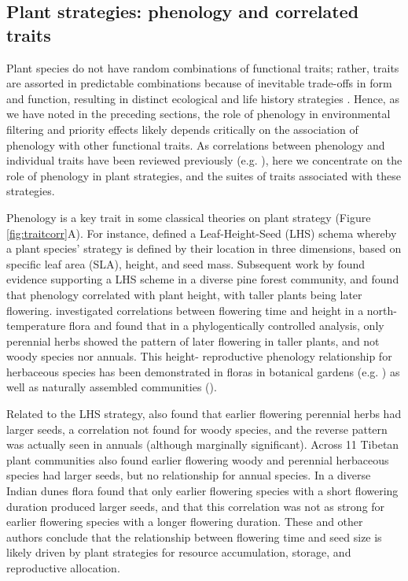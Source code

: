 \documentclass[11pt]{article}
\begin{document}

\subsection*{Plant strategies: phenology and correlated traits}

Plant species do not have random combinations of functional traits; rather, traits are assorted in predictable combinations because of inevitable trade-offs in form and function, resulting in distinct ecological and life history strategies \citep{stearns1998evolution,adler2014functional,westoby2002plant}. Hence, as we have noted in the preceding sections, the role of phenology in environmental filtering and priority effects likely depends critically on the association of phenology with other functional traits. As correlations between phenology and individual traits have been reviewed previously (e.g. \citet{wolkovich2014aob,segrestin2020reproductive}), here we concentrate on the role of phenology in plant strategies, and the suites of traits associated with these strategies.

Phenology is a key trait in some classical theories on plant strategy (Figure \ref{fig:traitcorr}A). For instance, \citet{westoby1998leaf} defined a Leaf-Height-Seed (LHS) schema whereby a plant species’ strategy is defined by their location in three dimensions, based on specific leaf area (SLA), height, and seed mass. Subsequent work by \citet{laughlin2010multi} found evidence supporting a LHS scheme in a diverse pine forest community, and found that phenology correlated with plant height, with taller plants being later flowering. \citet{bolmgren2008time} investigated correlations between flowering time and height in a north-temperature flora and found that in a phylogentically controlled analysis, only perennial herbs showed the pattern of later flowering in taller plants, and not woody species nor annuals. This height- reproductive phenology relationship for herbaceous species has been demonstrated in floras in botanical gardens (e.g. \citet{sporbert2022functional, horbach2023flowering}) as well as naturally assembled communities (\citet{du2010trade, liu2021linkage}). 

Related to the LHS strategy, \citet{bolmgren2008time} also found that earlier flowering perennial herbs had larger seeds, a correlation not found for woody species, and the reverse pattern was actually seen in annuals (although marginally significant). Across 11 Tibetan plant communities \citet{du2010trade} also found earlier flowering woody and perennial herbaceous species had larger seeds, but no relationship for annual species. In a diverse Indian dunes flora \citet{mazer1990seed} found that only earlier flowering species with a short flowering duration produced larger seeds, and that this correlation was not as strong for earlier flowering species with a longer flowering duration. These and other authors conclude that the relationship between flowering time and seed size is likely driven by plant strategies for resource accumulation, storage, and reproductive allocation.
\end{document}

